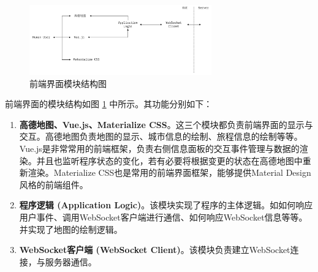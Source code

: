 \begin{figure}[t]
  \centering
  \includegraphics[width=0.7\textwidth]{figures/gui_arch}
  \caption{前端界面模块结构图}
  \label{fig:gui-arch}
\end{figure}

前端界面的模块结构如图 \ref{fig:gui-arch} 中所示。其功能分别如下：
\begin{enumerate}
  \item \textbf{高德地图、Vue.js、Materialize CSS}。这三个模块都负责前端界面的显示与交互。高德地图负责地图的显示、城市信息的绘制、旅程信息的绘制等等。Vue.js是非常常用的前端框架，负责右侧信息面板的交互事件管理与数据的渲染。并且也监听程序状态的变化，若有必要将根据变更的状态在高德地图中重新渲染。Materialize CSS也是常用的前端界面框架，能够提供Material Design风格的前端组件。
  \item \textbf{程序逻辑 (Application Logic)}。该模块实现了程序的主体逻辑。如如何响应用户事件、调用WebSocket客户端进行通信、如何响应WebSocket信息等等。并实现了地图的绘制逻辑。
  \item \textbf{WebSocket客户端 (WebSocket Client)}。该模块负责建立WebSocket连接，与服务器通信。
\end{enumerate}





















